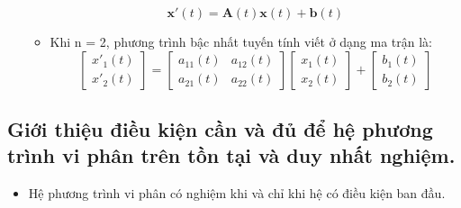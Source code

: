 \documentclass[a4paper]{article}
\begin{document}
\begin{itemize}
\begin{itemize}
    \[\textbf{x}'(t) = \textbf{A}(t)\textbf{x}(t) + \textbf{b}(t)\]
        \item Khi n = 2, phương trình bậc nhất tuyến tính viết ở dạng ma trận là:
    \[\begin{bmatrix}
        {x'_1(t)} \\
        {x'_2(t)}
    \end{bmatrix} = 
    \begin{bmatrix}
        {a_{11}(t)} & {a_{12}(t)} \\ 
        {a_{21}(t)} & {a_{22}(t)}
    \end{bmatrix}
    \begin{bmatrix}
        {x_1(t)} \\
        {x_2(t)}
    \end{bmatrix} + 
    \begin{bmatrix}
        {b_1(t)} \\
        {b_2(t)}
    \end{bmatrix}
    \]
    \end{itemize}
\end{itemize}
\subsection{Giới thiệu điều kiện cần và đủ để hệ phương trình vi phân trên tồn tại và duy nhất
nghiệm.}
    \begin{itemize}
        \item Hệ phương trình vi phân có nghiệm khi và chỉ khi hệ có điều kiện ban đầu.
    \end{itemize}
\end{document}
